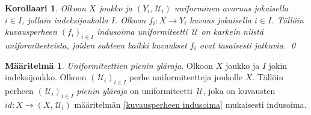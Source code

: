 \documentclass[12pt,a4paper,leqno]{report}
\newcommand{\U}{\,\mathcal{U}}
\theoremstyle{plain}
\newtheorem{kor}[equation]{Korollaari}
\theoremstyle{definition}
\newtheorem{maar}[equation]{Määritelmä}
\theoremstyle{remark}
\begin{document}
\begin{kor}
Olkoon $X$ joukko ja $(Y_i,\U_i)$ uniforminen avaruus jokaisella $i\in I$, jollain indeksijoukolla $I$. 
Olkoon $f_i\colon X\rightarrow Y_i$ kuvaus jokaisella $i\in I$.
Tällöin kuvausperheen $(f_i)_{i\in I}$ indusoima uniformiteetti $\U$ on karkein niistä uniformiteeteista, 
joiden suhteen kaikki kuvaukset $f_i$ ovat tasaisesti jatkuvia.
\qed
%
\end{kor}
\begin{maar}
\emph{Uniformiteettien pienin yläraja.}
Olkoon $X$ joukko ja $I$ jokin indeksijoukko.
Olkoon $(\U_i)_{i\in I}$ perhe uniformiteetteja joukolle $X$.
Tällöin perheen $(\U_i)_{i\in I}$ \emph{pienin yläraja} on uniformiteetti $\U$, joka on kuvausten $id\colon X\rightarrow (X,\U_i)$ määritelmän \ref{kuvausperheen indusoima} mukaisesti indusoima.
\end{maar}
\end{document}
